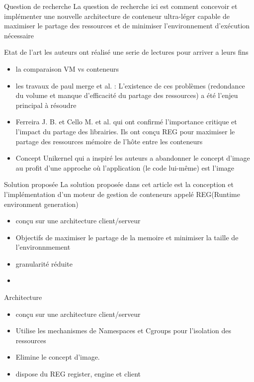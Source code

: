 \documentclass[9pt]{beamer}
\begin{document}
\begin{frame}{Question de recherche}
La question de recherche ici  est comment concevoir et implémenter une nouvelle architecture de conteneur ultra-léger capable de maximiser le partage des ressources  et de minimiser l'environnement d'exécution nécessaire
\end{frame}


 \begin{frame}{Etat de l'art}
 les auteurs ont réalisé une serie de lectures pour arriver a leurs fins 
\begin{itemize}[<+->]
    \item la comparaison VM vs conteneurs 
    \item les travaux de paul merge et al. : L'existence de ces problèmes (redondance du volume et manque d'efficacité du partage des ressources) a été l'enjeu principal à résoudre
    \item  Ferreira J. B. et Cello M. et al. qui ont confirmé l'importance critique et l'impact du partage des librairies.  Ils ont conçu REG pour maximiser le partage des ressources mémoire de l'hôte entre les conteneurs
    \item  Concept Unikernel qui a inspiré les auteurs a  abandonner le concept d'image au profit d'une approche où l'application (le code lui-même) est l'image 
\end{itemize}
\end{frame}


\begin{frame}{Solution proposée}
La solution proposée dans cet article est la conception et l'implémentation d'un moteur de gestion de conteneurs appelé REG(Runtime environment generation)
\begin{itemize}
    \item conçu sur une architecture client/serveur 
    \item Objectifs de maximiser le partage de la memoire et minimiser la taille de l'environnmement 
    \item granularité réduite
    \item 
\end{itemize}
\end{frame}

\begin{frame}{Architecture}

\begin{itemize}
    \item conçu sur une architecture client/serveur 
    \item Utilise les mechanismes de Namespaces et Cgroups pour l'isolation des ressources 
    \item Elimine le concept d'image.
    \item dispose du REG register, engine et client
\end{itemize}
\end{frame}
\end{document}
